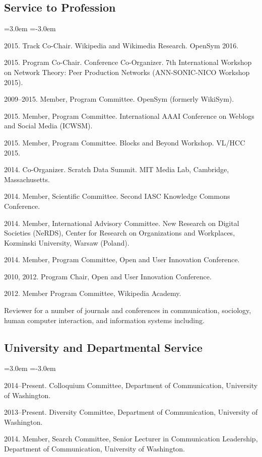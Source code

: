 \documentclass[10pt]{article}
\newenvironment{cvlist}{
\begin{list}{}{\leftmargin=3.0em \itemindent=-3.0em}
  \setlength{\itemsep}{0pt}
  \setlength{\parskip}{0em}
  \setlength{\parsep}{1em}
  \setlength{\parindent}{0em}}
{\vspace{1em}
\end{list}}
\begin{document}
\subsection{Service to Profession}

\begin{cvlist}
\item 2015. Track Co-Chair. Wikipedia and Wikimedia Research. OpenSym 2016.
\item 2015. Program Co-Chair. Conference Co-Organizer. 7th International Workshop on Network Theory: Peer Production Networks (ANN-SONIC-NICO Workshop 2015).
\item 2009--2015. Member, Program Committee. OpenSym (formerly WikiSym).
\item 2015. Member, Program Committee. International AAAI Conference on Weblogs and Social Media (ICWSM).
\item 2015. Member, Program Committee. Blocks and Beyond Workshop. VL/HCC 2015.
\item 2014. Co-Organizer. Scratch Data Summit. MIT Media Lab, Cambridge, Massachusetts.
\item 2014. Member, Scientific Committee. Second IASC Knowledge Commons Conference.
\item 2014. Member, International Advisory Committee. New Research on Digital Societies (NeRDS), Center for Research on Organizations and Workplaces, Kozminski University, Warsaw (Poland).
\item 2014. Member, Program Committee, Open and User Innovation Conference.
\item 2010, 2012. Program Chair, Open and User Innovation Conference.
\item 2012. Member Program Committee, Wikipedia Academy.
\item Reviewer for a number of journals and conferences in communication, sociology, human computer interaction, and information systems including.
\end{cvlist}

\subsection{University and Departmental Service}
\begin{cvlist}
\item 2014--Present. Colloquium Committee, Department of Communication, University of Washington.
\item 2013--Present. Diversity Committee, Department of Communication, University of Washington.
\item 2014. Member, Search Committee, Senior Lecturer in Communication Leadership, Department of Communication, University of Washington.
\end{cvlist}
\end{document}

